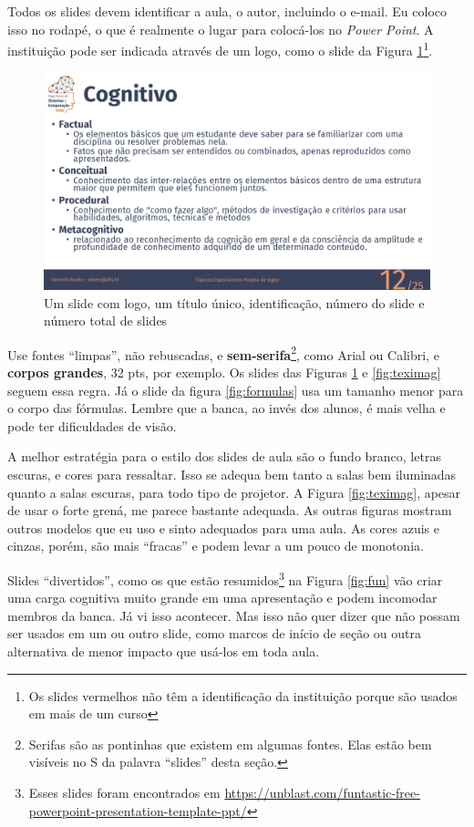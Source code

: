 \documentclass{article}
\def\tam{0.6}
\begin{document}
Todos os slides devem identificar a aula, o autor, incluindo o e-mail. Eu coloco isso no rodapé, o que é realmente o lugar para colocá-los no \textit{Power Point}. A instituição pode ser indicada através de um logo, como o slide da Figura \ref{fig:coppe}\footnote{Os slides vermelhos não têm a identificação da instituição porque são usados em mais de um curso}.

\begin{figure}[htb]
    \centering
    \includegraphics[width=\tam\linewidth]{imagens/slideexemplotepj.png}
    \caption{Um slide com logo, um título único, identificação, número do slide e número total de slides}
    \label{fig:coppe}
\end{figure}

Use fontes ``limpas'', não rebuscadas, e \textbf{sem-serifa}\footnote{Serifas são as pontinhas que existem em algumas fontes. Elas estão bem visíveis no S da palavra ``slides'' desta seção.}, como Arial ou Calibri, e \textbf{corpos grandes}, 32 pts, por exemplo. Os slides das Figuras \ref{fig:coppe} e \ref{fig:teximag} seguem essa regra. Já o slide da figura \ref{fig:formulas} usa um tamanho menor para o corpo das fórmulas. Lembre que a banca, ao invés dos alunos, é mais velha e pode ter dificuldades de visão.

A melhor estratégia para o estilo dos slides de aula são o fundo branco, letras escuras, e cores para ressaltar. Isso se adequa bem tanto a salas bem iluminadas quanto a salas escuras, para todo tipo de projetor. A Figura \ref{fig:teximag}, apesar de usar o forte grená, me parece bastante adequada. As outras figuras  mostram outros modelos que eu uso e sinto adequados para uma aula. As cores azuis e cinzas, porém, são mais ``fracas'' e podem levar a um pouco de monotonia. 

Slides ``divertidos'', como os que estão resumidos\footnote{Esses slides foram encontrados em     \url{https://unblast.com/funtastic-free-powerpoint-presentation-template-ppt/}
    } na Figura \ref{fig:fun} vão criar uma carga cognitiva muito grande em uma apresentação e podem incomodar membros da banca. Já vi isso acontecer. Mas isso não quer dizer que não possam ser usados em um ou outro slide, como marcos de início de seção ou outra alternativa de menor impacto que usá-los em toda aula.
\end{document}
